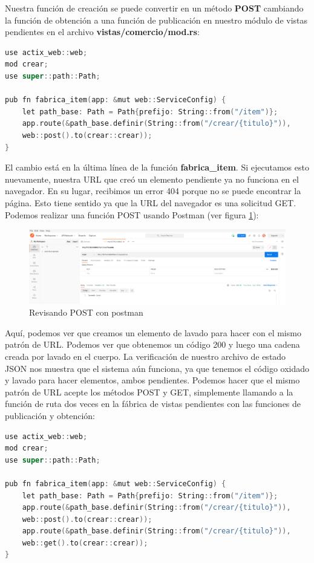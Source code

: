 Nuestra función de creación se puede convertir en un método \textbf{POST} cambiando la función de obtención a una función de publicación en nuestro módulo de vistas pendientes en el archivo \textbf{vistas/comercio/mod.rs}:


\begin{lstlisting}[language=C]
use actix_web::web;
mod crear;
use super::path::Path;

pub fn fabrica_item(app: &mut web::ServiceConfig) {
	let path_base: Path = Path{prefijo: String::from("/item")};
	app.route(&path_base.definir(String::from("/crear/{titulo}")),
	web::post().to(crear::crear));
}
\end{lstlisting}

El cambio está en la última línea de la función \textbf{fabrica\_item}. Si ejecutamos esto nuevamente, nuestra URL que creó un elemento pendiente ya no funciona en el navegador. En su lugar, recibimos un error 404 porque no se puede encontrar la página. Esto tiene sentido ya que la URL del navegador es una solicitud GET. Podemos realizar una función POST usando Postman (ver figura \ref{cap3:003}):

\begin{figure}[htb]
	\centering
	\includegraphics[width=1.0\textwidth]{capitulo3/postman_post.png}
	\caption{Revisando POST con postman}
	\label{cap3:003}
\end{figure}


Aquí, podemos ver que creamos un elemento de lavado para hacer con el mismo patrón de URL. Podemos ver que obtenemos un código 200 y luego una cadena creada por lavado en el cuerpo. La verificación de nuestro archivo de estado JSON nos muestra que el sistema aún funciona, ya que tenemos el código oxidado y lavado para hacer elementos, ambos pendientes. Podemos hacer que el mismo patrón de URL acepte los métodos POST y GET, simplemente llamando a la función de ruta dos veces en la fábrica de vistas pendientes con las funciones de publicación y obtención:

\begin{lstlisting}[language=C]
use actix_web::web;
mod crear;
use super::path::Path;

pub fn fabrica_item(app: &mut web::ServiceConfig) {
	let path_base: Path = Path{prefijo: String::from("/item")};
	app.route(&path_base.definir(String::from("/crear/{titulo}")),
	web::post().to(crear::crear));
	app.route(&path_base.definir(String::from("/crear/{titulo}")),
	web::get().to(crear::crear));
}
\end{lstlisting}


